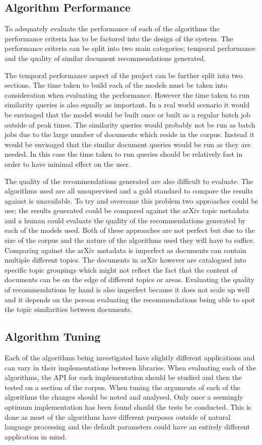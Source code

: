 \subsection{Algorithm Performance}
To adequately evaluate the performance of each of the algorithms the performance criteria has to be factored into the design of the system.
The performance criteria can be split into two main categories; temporal performance and the quality of similar document recommendations generated.

The temporal performance aspect of the project can be further split into two sections.
The time taken to build each of the models must be taken into consideration when evaluating the performance.
However the time taken to run similarity queries is also equally as important.
In a real world scenario it would be envisaged that the model would be built once or built as a regular batch job outside of peak times.
The similarity queries would probably not be run as batch jobs due to the large number of documents which reside in the corpus.
Instead it would be envisaged that the similar document queries would be run as they are needed.
In this case the time taken to run queries should be relatively fast in order to have minimal effect on the user.

The quality of the recommendations generated are also difficult to evaluate.
The algorithms used are all unsupervised and a gold standard to compare the results against is unavailable.
To try and overcome this problem two approaches could be use; the results generated could be compared against the arXiv topic metadata and a human could evaluate the quality of the recommendations generated by each of the models used.
Both of these approaches are not perfect but due to the size of the corpus and the nature of the algorithms used they will have to suffice.
Comparing against the arXiv metadata is imperfect as documents can contain multiple different topics.
The documents in arXiv however are catalogued into specific topic groupings which might not reflect the fact that the content of documents can be on the edge of different topics or areas.
Evaluating the quality of recommendations by hand is also imperfect because it does not scale up well and it depends on the person evaluating the recommendations being able to spot the topic similarities between documents.

\subsection{Algorithm Tuning}
Each of the algorithms being investigated have slightly different applications and can vary in their implementations between libraries.
When evaluating each of the algorithms, the API for each implementation should be studied and then the tested on a section of the corpus.
When tuning the arguments of each of the algorithms the changes should be noted and analysed.
Only once a seemingly optimum implementation has been found should the tests be conducted.
This is done as most of the algorithms have different purposes outside of natural language processing and the default parameters could have an entirely different application in mind.

